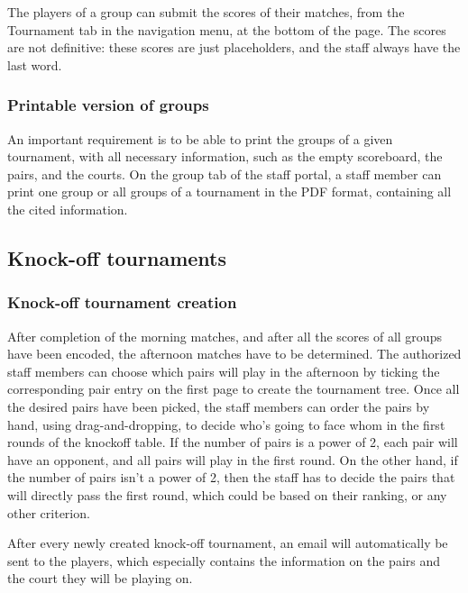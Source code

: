 The players of a group can submit the scores of their matches, from the
Tournament tab in the navigation menu, at the bottom of the page.
The scores are not definitive: these scores are just placeholders, and
the staff always have the last word.

\subsubsection{Printable version of groups}
\label{subs:Printable version of groups}

An important requirement is to be able to print the groups of a given
tournament, with all necessary information, such as the empty scoreboard, the
pairs, and the courts. On the group tab of the staff portal, a staff member can
print one group or all groups of a tournament in the PDF format, containing
all the cited information.

\subsection{Knock-off tournaments}
\label{sub:Knock-off tournaments}

\subsubsection{Knock-off tournament creation}
\label{subs:Knock-off tournament creation}

After completion of the morning matches, and after all the scores of all groups
have been encoded, the afternoon matches have to be determined.
The authorized staff members can choose which pairs will play
in the afternoon by ticking the corresponding pair entry on the first page
to create the tournament tree. Once all the desired pairs have been picked,
the staff members can order the pairs by hand, using drag-and-dropping,
to decide who's going to face whom in the first rounds of the knockoff table.
If the number of pairs is a power of 2, each pair will have an opponent, and
all pairs will play in the first round. On the other hand, if the number of
pairs isn't a power of 2, then the staff has to decide the pairs that will
directly pass the first round, which could be based on their ranking, or any
other criterion. \newline

After every newly created knock-off tournament, an email will automatically be
sent to the players, which especially contains the information on the pairs and
the court they will be playing on.

